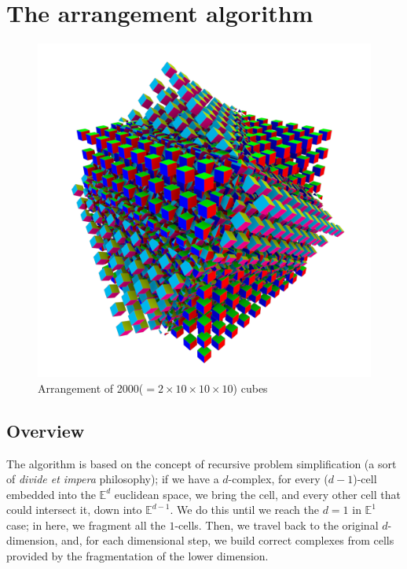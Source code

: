 \chapter{The arrangement algorithm}
\label{ch:arrangement_algorithm}

\begin{figure}[H]
    \centering
    \includegraphics[width=\textwidth]{./img/cube10x10.pdf}
    \caption{Arrangement of 2000($=2\times10\times10\times10$) cubes}
\end{figure}





\section{Overview}
\label{sec:spatial_arrangement_overview}
The algorithm is based on the concept of recursive problem simplification 
(a sort of \textit{divide et impera} philosophy); if we have a $d$-complex, for every
($d-1$)-cell embedded into the $\mathbb{E}^d$ euclidean space, we bring the cell,
and every other cell that could intersect it, down into $\mathbb{E}^{d-1}$. We do this until
we reach the $d=1$ in $\mathbb{E}^1$ case; in here, we fragment all the $1$-cells.
Then, we travel back to the original $d$-dimension, and, for each
dimensional step, we build correct complexes from cells provided by the 
fragmentation of the lower dimension. 


